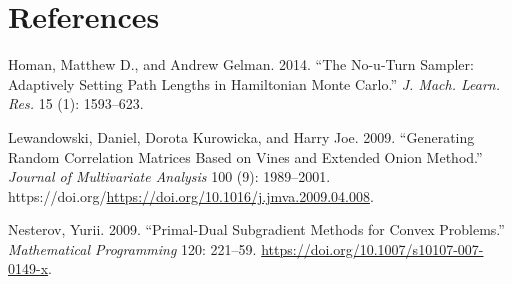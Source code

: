 \documentclass[
  12pt,
]{article}
\newlength{\cslhangindent}
\newlength{\cslentryspacingunit} %
\newenvironment{CSLReferences}[2] %
 {%
  \setlength{\parindent}{0pt}
  \ifodd #1
  \let\oldpar\par
  \def\par{\hangindent=\cslhangindent\oldpar}
  \fi
  \setlength{\parskip}{#2\cslentryspacingunit}
 }%
 {}
\begin{document}
\hypertarget{references}{%
\section*{References}\label{references}}

\hypertarget{refs}{}
\begin{CSLReferences}{1}{0}
\leavevmode{}%
Homan, Matthew D., and Andrew Gelman. 2014. {``The No-u-Turn Sampler:
Adaptively Setting Path Lengths in Hamiltonian Monte Carlo.''} \emph{J.
Mach. Learn. Res.} 15 (1): 1593--623.

\leavevmode{}%
Lewandowski, Daniel, Dorota Kurowicka, and Harry Joe. 2009.
{``Generating Random Correlation Matrices Based on Vines and Extended
Onion Method.''} \emph{Journal of Multivariate Analysis} 100 (9):
1989--2001.
https://doi.org/\url{https://doi.org/10.1016/j.jmva.2009.04.008}.

\leavevmode{}%
Nesterov, Yurii. 2009. {``Primal-Dual Subgradient Methods for Convex
Problems.''} \emph{Mathematical Programming} 120: 221--59.
\url{https://doi.org/10.1007/s10107-007-0149-x}.

\end{CSLReferences}
\end{document}
